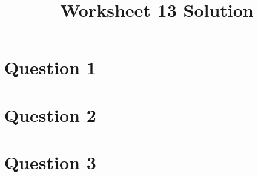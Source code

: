 \documentclass[12pt]{article}
\begin{document}
\title{Worksheet 13 Solution}
\maketitle

\section*{Question 1}

\section*{Question 2}

\section*{Question 3}
\end{document}
